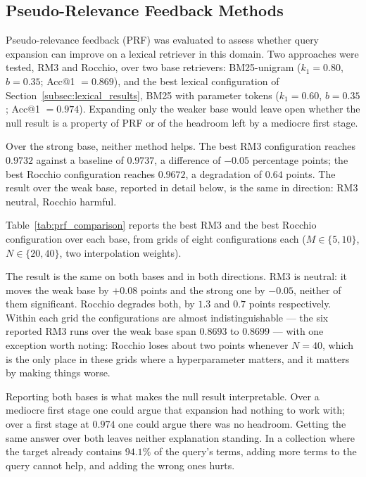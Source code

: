 \documentclass[preprint,review,12pt]{elsarticle}
\begin{document}
\FloatBarrier
\subsection{Pseudo-Relevance Feedback Methods}
\label{subsec:prf}

Pseudo-relevance feedback (PRF) was evaluated to assess whether query expansion can improve on a lexical retriever in this domain. Two approaches were tested, RM3 and Rocchio, over two base retrievers: BM25-unigram ($k_1=0.80$, $b=0.35$; Acc@1 $=0.869$), and the best lexical configuration of Section~\ref{subsec:lexical_results}, BM25 with parameter tokens ($k_1=0.60$, $b=0.35$; Acc@1 $=0.974$). Expanding only the weaker base would leave open whether the null result is a property of PRF or of the headroom left by a mediocre first stage.

Over the strong base, neither method helps. The best RM3 configuration reaches $0.9732$ against a baseline of $0.9737$, a difference of $-0.05$ percentage points; the best Rocchio configuration reaches $0.9672$, a degradation of $0.64$ points. The result over the weak base, reported in detail below, is the same in direction: RM3 neutral, Rocchio harmful.

Table~\ref{tab:prf_comparison} reports the best RM3 and the best Rocchio configuration over each base, from grids of eight configurations each ($M \in \{5, 10\}$, $N \in \{20, 40\}$, two interpolation weights).



The result is the same on both bases and in both directions. RM3 is neutral: it moves the weak base by $+0.08$ points and the strong one by $-0.05$, neither of them significant. Rocchio degrades both, by $1.3$ and $0.7$ points respectively. Within each grid the configurations are almost indistinguishable --- the six reported RM3 runs over the weak base span $0.8693$ to $0.8699$ --- with one exception worth noting: Rocchio loses about two points whenever $N=40$, which is the only place in these grids where a hyperparameter matters, and it matters by making things worse.

Reporting both bases is what makes the null result interpretable. Over a mediocre first stage one could argue that expansion had nothing to work with; over a first stage at $0.974$ one could argue there was no headroom. Getting the same answer over both leaves neither explanation standing. In a collection where the target already contains $94.1\%$ of the query's terms, adding more terms to the query cannot help, and adding the wrong ones hurts.
\end{document}
